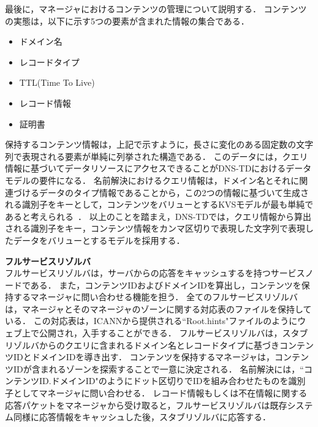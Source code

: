 最後に，マネージャにおけるコンテンツの管理について説明する．
コンテンツの実態は，以下に示す5つの要素が含まれた情報の集合である．
\begin{itemize}
 \item ドメイン名
 \vspace{-3mm}
 \item レコードタイプ
 \vspace{-3mm}
 \item TTL(Time To Live)
 \vspace{-3mm}
 \item レコード情報
 \vspace{-3mm}
 \item 証明書
\end{itemize}
保持するコンテンツ情報は，上記で示すように，長さに変化のある固定数の文字列で表現される要素が単純に列挙された構造である．
このデータには，クエリ情報に基づいてデータリソースにアクセスできることがDNS-TDにおけるデータモデルの要件になる．
名前解決におけるクエリ情報は，ドメイン名とそれに関連づけるデータのタイプ情報であることから，この2つの情報に基づいて生成される識別子をキーとして，コンテンツをバリューとするKVSモデルが最も単純であると考えられる~\cite{Davoudian}．
以上のことを踏まえ，DNS-TDでは，クエリ情報から算出される識別子をキー，コンテンツ情報をカンマ区切りで表現した文字列で表現したデータをバリューとするモデルを採用する．

\hspace{-12pt}\textbf{フルサービスリゾルバ}\\
\hspace{12pt}フルサービスリゾルバは，サーバからの応答をキャッシュするを持つサービスノードである．
また，コンテンツIDおよびドメインIDを算出し，コンテンツを保持するマネージャに問い合わせる機能を担う．
全てのフルサービスリゾルバは，マネージャとそのマネージャのゾーンに関する対応表のファイルを保持している．
この対応表は，ICANNから提供される``Root.hints"ファイルのようにウェブ上で公開され，入手することができる．
フルサービスリゾルバは，スタブリゾルバからのクエリに含まれるドメイン名とレコードタイプに基づきコンテンツIDとドメインIDを導き出す．
コンテンツを保持するマネージャは，コンテンツIDが含まれるゾーンを探索することで一意に決定される．
名前解決には，``コンテンツID.ドメインID"のようにドット区切りでIDを組み合わせたものを識別子としてマネージャに問い合わせる．
レコード情報もしくは不在情報に関する応答パケットをマネージャから受け取ると，フルサービスリゾルバは既存システム同様に応答情報をキャッシュした後，スタブリゾルバに応答する．\\

